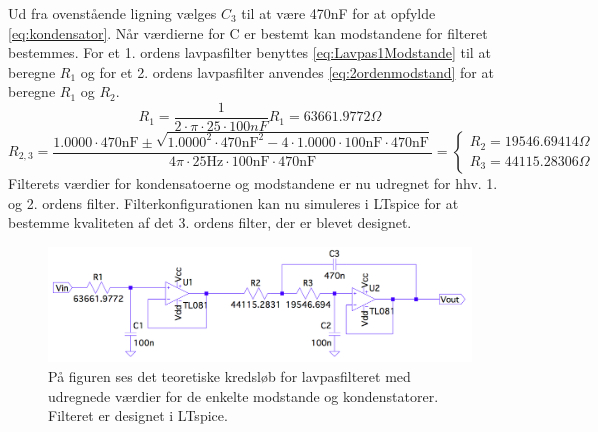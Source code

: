\noindent Ud fra ovenstående ligning vælges $C_3$ til at være 470nF for at opfylde \eqref{eq:kondensator}. Når værdierne for C er bestemt kan modstandene for filteret bestemmes. For et 1. ordens lavpasfilter benyttes \eqref{eq:Lavpas1Modstande} til at beregne $R_1$ og for et 2. ordens lavpasfilter anvendes \eqref{eq:2ordenmodstand} for at beregne $R_1$ og $R_2$. 
\begin{equation} \label{eq:1ordenmodstand}
R_{1} = \frac{1}{2 \cdot \pi \cdot 25 \cdot 100nF} R_{1} = 63661.9772 \Omega
\end{equation}
\begin{equation}
\label{eq:2ordenmodstand}R_{2,3} = \frac{1.0000 \cdot 470\text{nF} \pm \sqrt{1.0000^2 \cdot 470\text{nF}^2 - 4 \cdot 1.0000 \cdot 100\text{nF} \cdot 470\text{nF}}}{4 \pi \cdot 25\text{Hz} \cdot 100\text{nF} \cdot 470\text{nF}} = \begin{cases} R_{2} = 19546.69414 \Omega \\ R_{3} =  44115.28306 \Omega \end{cases}
\end{equation}
\noindent Filterets værdier for kondensatoerne og modstandene er nu udregnet for hhv. 1. og 2. ordens filter. Filterkonfigurationen kan nu simuleres i LTspice for at bestemme kvaliteten af det 3. ordens filter, der er blevet designet.

\begin{figure}[H]
	\centering
	\includegraphics[scale=0.35]{figures/cProblemloesning/Lavpasfilter1_LTspice.PNG}
	\caption{På figuren ses det teoretiske kredsløb for lavpasfilteret med udregnede værdier for de enkelte modstande og kondenstatorer. Filteret er designet i LTspice.}
	\label{fig:lavpasfilter1_LTspice}
\end{figure}

